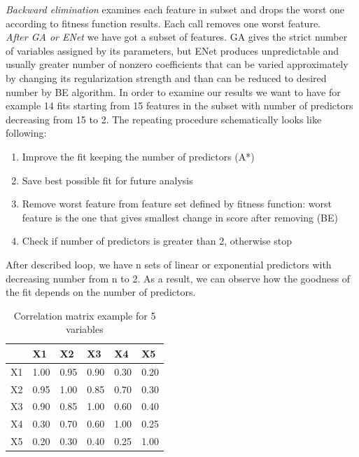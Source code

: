 \documentclass[aps,prl,reprint,amsmath,amssymb,nature]{revtex4-1}
\begin{document}
\textit{Backward elimination} \old examines each feature in subset and drops the worst one according to fitness function results. Each call removes one worst feature.\\

\textit{After GA or ENet} \old we have got a subset of features. GA gives the strict number of variables assigned by its parameters, but ENet produces unpredictable and usually greater number of nonzero coefficients that can be varied approximately by changing its regularization strength and than can be reduced to desired number by BE algorithm. In order to examine our results we want to have for example 14 fits starting from 15 features in the subset with number of predictors decreasing from 15 to 2. 
The repeating procedure schematically looks like following:
\begin{enumerate}
\item Improve the fit keeping the number of predictors (A*)
\item Save best possible fit for future analysis
\item Remove worst feature from feature set defined by fitness function: worst feature is the one that gives smallest change in score after removing (BE)
\item Check if number of predictors is greater than 2, otherwise stop
\setcounter{numberedCntH}{\theenumi}
\end{enumerate}
After described loop, we have n sets of linear or exponential predictors with decreasing number from n to 2. As a result, we can observe how the goodness of the fit depends on the number of predictors.

\begin{table}[h]
\centering
\caption{Correlation matrix example for 5 variables}\label{Correlation_matrix}
\begin{tabular}{|l|l|l|l|l|l|}
\hline
  & X1 & X2 & X3 & X4 & X5 \\
\hline
X1 & 1.00 & 0.95 & 0.90 & 0.30 & 0.20 \\
\hline
X2 & 0.95 & 1.00 & 0.85 & 0.70 & 0.30 \\
\hline
X3 & 0.90 & 0.85 & 1.00 & 0.60 & 0.40 \\
\hline
X4 & 0.30 & 0.70 & 0.60 & 1.00 & 0.25 \\
\hline
X5 & 0.20 & 0.30 & 0.40 & 0.25 & 1.00 \\
\hline
\end{tabular}
\end{table}
\end{document}
